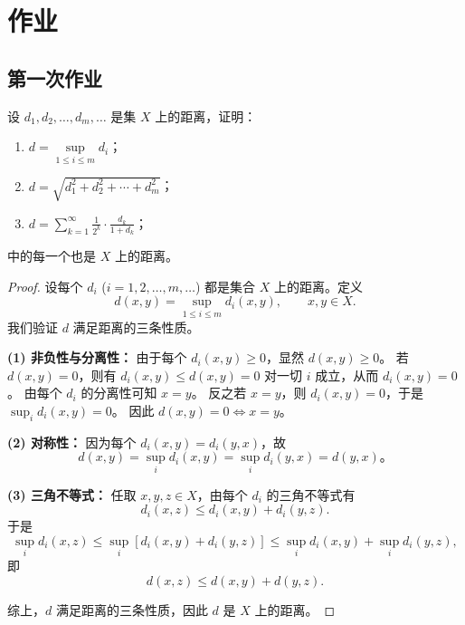 \chapter{作业}
\section{第一次作业}
\begin{homework}[第 3 题]
设 $d_1,d_2,\dots,d_m,\dots$ 是集 $X$ 上的距离，证明：

\begin{enumerate}
  \item $d = \sup\limits_{1 \leq i \leq m} d_i$；
  \item $d = \sqrt{d_1^2 + d_2^2 + \cdots + d_m^2}$；
  \item $d = \sum\limits_{k=1}^{\infty} \frac{1}{2^k} \cdot \frac{d_k}{1+d_k}$；
\end{enumerate}

中的每一个也是 $X$ 上的距离。
\end{homework}

\begin{proof}
设每个 $d_i$ ($i=1,2,\dots,m,\dots$) 都是集合 $X$ 上的距离。定义
\[
d(x,y)=\sup_{1\le i\le m} d_i(x,y), \qquad x,y\in X.
\]
我们验证 $d$ 满足距离的三条性质。

\textbf{(1) 非负性与分离性：}
由于每个 $d_i(x,y)\ge0$，显然 $d(x,y)\ge0$。  
若 $d(x,y)=0$，则有 $d_i(x,y)\le d(x,y)=0$ 对一切 $i$ 成立，从而 $d_i(x,y)=0$。  
由每个 $d_i$ 的分离性可知 $x=y$。  
反之若 $x=y$，则 $d_i(x,y)=0$，于是 $\sup_i d_i(x,y)=0$。  
因此 $d(x,y)=0\iff x=y$。

\textbf{(2) 对称性：}
因为每个 $d_i(x,y)=d_i(y,x)$，故
\[
d(x,y)=\sup_i d_i(x,y)=\sup_i d_i(y,x)=d(y,x)。
\]

\textbf{(3) 三角不等式：}
任取 $x,y,z\in X$，由每个 $d_i$ 的三角不等式有
\[
d_i(x,z)\le d_i(x,y)+d_i(y,z).
\]
于是
\[
\sup_i d_i(x,z)\le \sup_i[d_i(x,y)+d_i(y,z)]
\le \sup_i d_i(x,y)+\sup_i d_i(y,z),
\]
即
\[
d(x,z)\le d(x,y)+d(y,z).
\]

综上，$d$ 满足距离的三条性质，因此 $d$ 是 $X$ 上的距离。
\end{proof}

